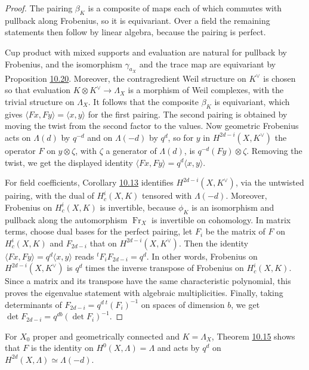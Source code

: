\documentclass[11pt]{article}
\begin{document}
\begin{proof}[{Proof}]\label{bp66}%
The pairing \(\beta_K\) is a composite of maps each of which commutes with pullback along Frobenius, so it is equivariant. Over a field the remaining statements then follow by linear algebra, because the pairing is perfect.

Cup product with mixed supports and evaluation are natural for pullback by Frobenius, and the isomorphism \(\gamma_{a_X}\) and the trace map are equivariant by Proposition \hyperref[bp62]{10.20}. Moreover, the contragredient Weil structure on \(K^\vee\) is chosen so that evaluation \(K\otimes K^\vee\to\Lambda_X\) is a morphism of Weil complexes, with the trivial structure on \(\Lambda_X\). It follows that the composite \(\beta_K\) is equivariant, which gives \(\langle Fx,Fy\rangle=\langle
x,y\rangle\) for the first pairing. The second pairing is obtained by moving the twist from the second factor to the values. Now geometric Frobenius acts on \(\Lambda(d)\) by \(q^{-d}\) and on \(\Lambda(-d)\) by \(q^d\), so for \(y\) in \(H^{2d-i}(X,K^\vee)\) the operator \(F\) on \(y\otimes\zeta\), with \(\zeta\) a generator of \(\Lambda(d)\), is \(q^{-d}(Fy)\otimes\zeta\). Removing the twist, we get the displayed identity \(\langle Fx,Fy\rangle=q^d\langle x,y\rangle\).

For field coefficients, Corollary \hyperref[bp40]{10.13} identifies \(H^{2d-i}(X,K^\vee)\), via the untwisted pairing, with the dual of \(H_c^i(X,K)\) tensored with \(\Lambda(-d)\). Moreover, Frobenius on \(H_c^i(X,K)\) is invertible, because \(\phi_K\) is an isomorphism and pullback along the automorphism \(\operatorname{Fr}_X\) is invertible on cohomology. In matrix terms, choose dual bases for the perfect pairing, let \(F_i\) be the matrix of \(F\) on \(H^i_c(X,K)\) and \(F_{2d-i}\) that on \(H^{2d-i}(X,K^\vee)\). Then the identity \(\langle Fx,Fy\rangle=q^d\langle x,y\rangle\) reads \({}^tF_iF_{2d-i}=q^d\). In other words, Frobenius on \(H^{2d-i}(X,K^\vee)\) is \(q^d\) times the inverse transpose of Frobenius on \(H_c^i(X,K)\). Since a matrix and its transpose have the same characteristic polynomial, this proves the eigenvalue statement with algebraic multiplicities. Finally, taking determinants of \(F_{2d-i}=q^d\,{}^t(F_i)^{-1}\) on spaces of dimension \(b\), we get \(\det F_{2d-i}=q^{db}(\det F_i)^{-1}\).
\end{proof}

\label{bp67}%
For \(X_0\) proper and geometrically connected and \(K=\Lambda_X\), Theorem \hyperref[bp46]{10.15} shows that \(F\) is the identity on \(H^0(X,\Lambda)=\Lambda\) and acts by \(q^d\) on \(H^{2d}(X,\Lambda)\simeq\Lambda(-d)\).
\end{document}

